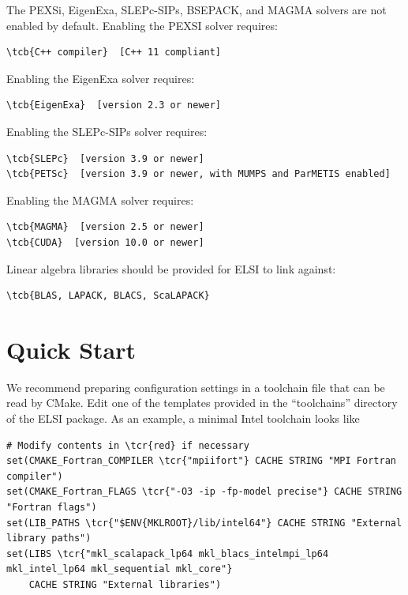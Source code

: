 \documentclass{report}
\newcommand{\tcb}[1]{\textcolor{blue}{#1}}
\newcommand{\tcr}[1]{\textcolor{red}{#1}}
\begin{document}
The PEXSi, EigenExa, SLEPc-SIPs, BSEPACK, and MAGMA solvers are not enabled by default. Enabling the PEXSI solver requires:
\begin{Verbatim}[commandchars=\\\{\}]
\tcb{C++ compiler}  [C++ 11 compliant]
\end{Verbatim}

Enabling the EigenExa solver requires:
\begin{Verbatim}[commandchars=\\\{\}]
\tcb{EigenExa}  [version 2.3 or newer]
\end{Verbatim}

Enabling the SLEPc-SIPs solver requires:
\begin{Verbatim}[commandchars=\\\{\}]
\tcb{SLEPc}  [version 3.9 or newer]
\tcb{PETSc}  [version 3.9 or newer, with MUMPS and ParMETIS enabled]
\end{Verbatim}

Enabling the MAGMA solver requires:
\begin{Verbatim}[commandchars=\\\{\}]
\tcb{MAGMA}  [version 2.5 or newer]
\tcb{CUDA}  [version 10.0 or newer]
\end{Verbatim}

Linear algebra libraries should be provided for ELSI to link against:
\begin{Verbatim}[commandchars=\\\{\}]
\tcb{BLAS, LAPACK, BLACS, ScaLAPACK}
\end{Verbatim}

\section{Quick Start}
\label{sec:quick}
We recommend preparing configuration settings in a toolchain file that can be read by CMake. Edit one of the templates provided in the ``toolchains'' directory of the ELSI package. As an example, a minimal Intel toolchain looks like
\begin{tcolorbox}
\begin{Verbatim}[commandchars=\\\{\}]
# Modify contents in \tcr{red} if necessary
set(CMAKE_Fortran_COMPILER \tcr{"mpiifort"} CACHE STRING "MPI Fortran compiler")
set(CMAKE_Fortran_FLAGS \tcr{"-O3 -ip -fp-model precise"} CACHE STRING "Fortran flags")
set(LIB_PATHS \tcr{"$ENV{MKLROOT}/lib/intel64"} CACHE STRING "External library paths")
set(LIBS \tcr{"mkl_scalapack_lp64 mkl_blacs_intelmpi_lp64 mkl_intel_lp64 mkl_sequential mkl_core"}
    CACHE STRING "External libraries")
\end{Verbatim}
\end{tcolorbox}
\end{document}
